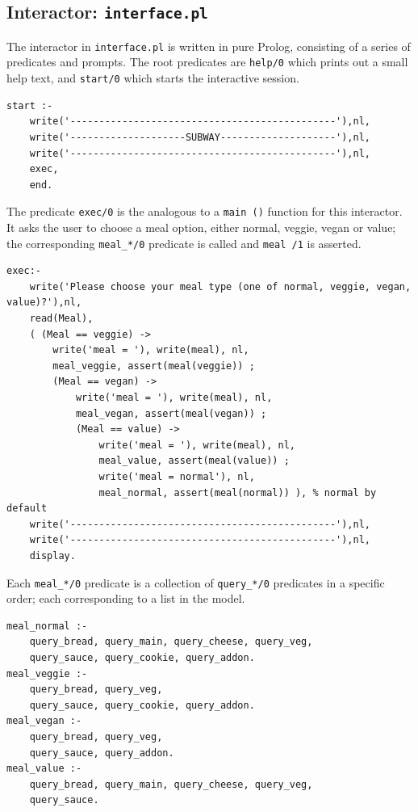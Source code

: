 \documentclass[11pt]{report}
\begin{document}
\subsection*{Interactor: \texttt{interface.pl}}

The interactor in \texttt{interface.pl} is written in pure Prolog, consisting
of a series of predicates and prompts. The root predicates are \texttt{help/0}
which prints out a small help text, and \texttt{start/0} which starts the
interactive session.

\begin{lstlisting}
start :-
    write('----------------------------------------------'),nl,
    write('--------------------SUBWAY--------------------'),nl,
    write('----------------------------------------------'),nl,
    exec,
    end.
\end{lstlisting}

The predicate \texttt{exec/0} is the analogous to a \texttt{main\,()} function for
this interactor. It asks the user to choose a meal option, either normal, veggie,
vegan or value; the corresponding \texttt{meal\_*/0} predicate is called and
\texttt{meal\,/1} is asserted. 

\begin{lstlisting}
exec:-
    write('Please choose your meal type (one of normal, veggie, vegan, value)?'),nl,
    read(Meal),
    ( (Meal == veggie) -> 
        write('meal = '), write(meal), nl,
        meal_veggie, assert(meal(veggie)) ;
        (Meal == vegan) ->
            write('meal = '), write(meal), nl,
            meal_vegan, assert(meal(vegan)) ;
            (Meal == value) ->
                write('meal = '), write(meal), nl,
                meal_value, assert(meal(value)) ;
                write('meal = normal'), nl,
                meal_normal, assert(meal(normal)) ), % normal by default
    write('----------------------------------------------'),nl,
    write('----------------------------------------------'),nl,
    display. 
\end{lstlisting}

Each \texttt{meal\_*/0} predicate is a collection of \texttt{query\_*/0} predicates
in a specific order; each corresponding to a list in the model.

\begin{lstlisting}
meal_normal :-
    query_bread, query_main, query_cheese, query_veg,
    query_sauce, query_cookie, query_addon.
meal_veggie :-
    query_bread, query_veg,
    query_sauce, query_cookie, query_addon.
meal_vegan :-
    query_bread, query_veg,
    query_sauce, query_addon.
meal_value :-
    query_bread, query_main, query_cheese, query_veg,
    query_sauce.
\end{lstlisting}
\end{document}
